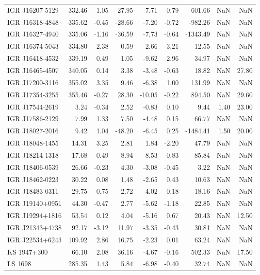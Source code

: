 \documentclass{article}%
\begin{document}
\begin{longtable}{lrrrrrrrr}
IGR J16207-5129 & 332.46 & -1.05 & 27.95 & -7.71 & -0.79 & 601.66 & NaN & NaN \\
IGR J16318-4848 & 335.62 & -0.45 & -28.66 & -7.20 & -0.72 & -982.26 & NaN & NaN \\
IGR J16327-4940 & 335.06 & -1.16 & -36.59 & -7.73 & -0.64 & -1343.49 & NaN & NaN \\
IGR J16374-5043 & 334.80 & -2.38 & 0.59 & -2.66 & -3.21 & 12.55 & NaN & NaN \\
IGR J16418-4532 & 339.19 & 0.49 & 1.05 & -9.62 & 2.96 & 34.97 & NaN & NaN \\
IGR J16465-4507 & 340.05 & 0.14 & 3.38 & -3.48 & -0.63 & 18.82 & NaN & 27.80 \\
IGR J17200-3116 & 355.02 & 3.35 & 9.46 & -6.38 & 1.00 & 131.99 & NaN & NaN \\
IGR J17354-3255 & 355.46 & -0.27 & 28.30 & -10.05 & -0.22 & 894.50 & NaN & 29.60 \\
IGR J17544-2619 & 3.24 & -0.34 & 2.52 & -0.83 & 0.10 & 9.44 & 1.40 & 23.00 \\
IGR J17586-2129 & 7.99 & 1.33 & 7.50 & -4.48 & 0.15 & 66.77 & NaN & NaN \\
IGR J18027-2016 & 9.42 & 1.04 & -48.20 & -6.45 & 0.25 & -1484.41 & 1.50 & 20.00 \\
IGR J18048-1455 & 14.31 & 3.25 & 2.81 & 1.84 & -2.20 & 47.79 & NaN & NaN \\
IGR J18214-1318 & 17.68 & 0.49 & 8.94 & -8.53 & 0.83 & 85.84 & NaN & NaN \\
IGR J18406-0539 & 26.66 & -0.23 & 4.30 & -3.08 & -0.45 & 3.22 & NaN & NaN \\
IGR J18462-0223 & 30.22 & 0.08 & 1.48 & -2.65 & 0.43 & 10.63 & NaN & NaN \\
IGR J18483-0311 & 29.75 & -0.75 & 2.72 & -4.02 & -0.18 & 18.16 & NaN & NaN \\
IGR J19140+0951 & 44.30 & -0.47 & 2.77 & -5.62 & -1.18 & 22.85 & NaN & NaN \\
IGR J19294+1816 & 53.54 & 0.12 & 4.04 & -5.16 & 0.67 & 20.43 & NaN & 12.50 \\
IGR J21343+4738 & 92.17 & -3.12 & 11.97 & -3.35 & -0.43 & 30.81 & NaN & NaN \\
IGR J22534+6243 & 109.92 & 2.86 & 16.75 & -2.23 & 0.01 & 63.24 & NaN & NaN \\
KS 1947+300 & 66.10 & 2.08 & 36.16 & -4.67 & -0.16 & 502.33 & NaN & 17.50 \\
LS 1698 & 285.35 & 1.43 & 5.84 & -6.98 & -0.40 & 32.74 & NaN & NaN \\

\end{longtable}
\end{document}
